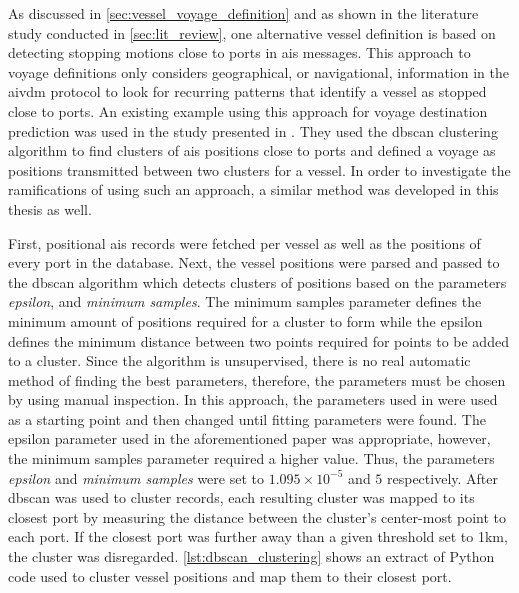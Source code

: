 As discussed in \cref{sec:vessel_voyage_definition} and as shown in the literature study conducted in \cref{sec:lit_review}, one alternative vessel definition is based on detecting stopping motions close to ports in \acrshort{ais} messages. This approach to voyage definitions only considers geographical, or navigational, information in the \gls{aivdm} protocol to look for recurring patterns that identify a vessel as stopped close to ports. An existing example using this approach for voyage destination prediction was used in the study presented in \cite{Zhang2020AISApproach}. They used the \acrfull{dbscan} clustering algorithm to find clusters of \acrshort{ais} positions close to ports and defined a voyage as positions transmitted between two clusters for a vessel. In order to investigate the ramifications of using such an approach, a similar method was developed in this thesis as well.

First, positional \acrshort{ais} records were fetched per vessel as well as the positions of every port in the database. Next, the vessel positions were parsed and passed to the \acrshort{dbscan} algorithm which detects clusters of positions based on the parameters \textit{epsilon}, and \textit{minimum samples}. The minimum samples parameter defines the minimum amount of positions required for a cluster to form while the epsilon defines the minimum distance between two points required for points to be added to a cluster. Since the algorithm is unsupervised, there is no real automatic method of finding the best parameters, therefore, the parameters must be chosen by using manual inspection. In this approach, the parameters used in \cite{Zhang2020AISApproach} were used as a starting point and then changed until fitting parameters were found. The epsilon parameter used in the aforementioned paper was appropriate, however, the minimum samples parameter required a higher value. Thus, the parameters \textit{epsilon} and \textit{minimum samples} were set to $1.095 \times 10^{-5}$ and $5$ respectively. After \acrshort{dbscan} was used to cluster records, each resulting cluster was mapped to its closest port by measuring the distance between the cluster's center-most point to each port. If the closest port was further away than a given threshold set to 1km, the cluster was disregarded. \cref{lst:dbscan_clustering} shows an extract of Python code used to cluster vessel positions and map them to their closest port.


